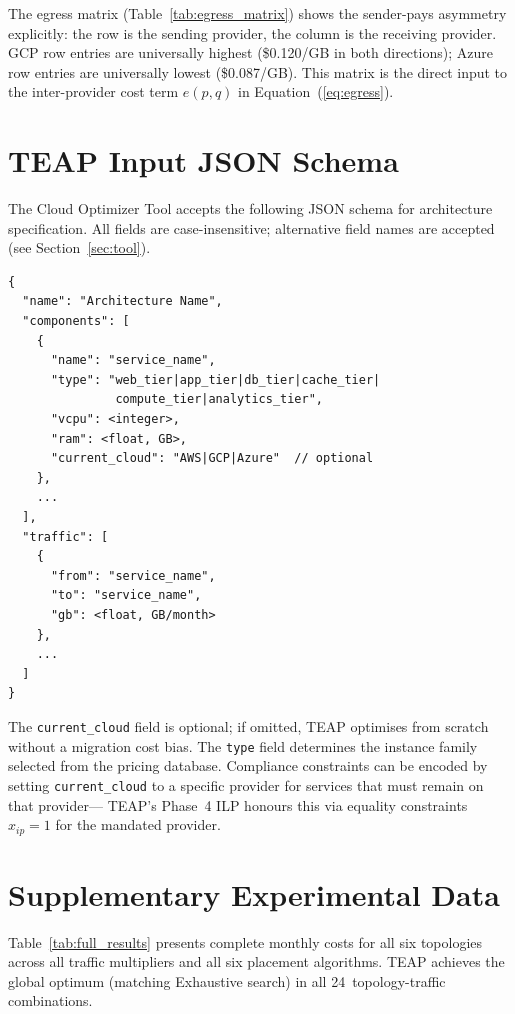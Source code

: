 \documentclass[10pt,journal]{IEEEtran}
\begin{document}
The egress matrix (Table~\ref{tab:egress_matrix}) shows the sender-pays asymmetry
explicitly: the row is the sending provider, the column is the receiving provider.
GCP row entries are universally highest (\$0.120/GB in both directions);
Azure row entries are universally lowest (\$0.087/GB).
This matrix is the direct input to the inter-provider cost term
$e(p,q)$ in Equation~(\ref{eq:egress}).

\section{TEAP Input JSON Schema}\label{app:schema}

The Cloud Optimizer Tool accepts the following JSON schema for architecture
specification.
All fields are case-insensitive; alternative field names are accepted
(see Section~\ref{sec:tool}).

{\small\begin{verbatim}
{
  "name": "Architecture Name",
  "components": [
    {
      "name": "service_name",
      "type": "web_tier|app_tier|db_tier|cache_tier|
               compute_tier|analytics_tier",
      "vcpu": <integer>,
      "ram": <float, GB>,
      "current_cloud": "AWS|GCP|Azure"  // optional
    },
    ...
  ],
  "traffic": [
    {
      "from": "service_name",
      "to": "service_name",
      "gb": <float, GB/month>
    },
    ...
  ]
}
\end{verbatim}}

The \texttt{current\_cloud} field is optional; if omitted, TEAP optimises
from scratch without a migration cost bias.
The \texttt{type} field determines the instance family selected from the
pricing database.
Compliance constraints can be encoded by setting \texttt{current\_cloud}
to a specific provider for services that must remain on that provider---
TEAP's Phase~4 ILP honours this via equality constraints
$x_{ip} = 1$ for the mandated provider.

\section{Supplementary Experimental Data}\label{app:supp}

Table~\ref{tab:full_results} presents complete monthly costs for all six topologies
across all traffic multipliers and all six placement algorithms. TEAP achieves the
global optimum (matching Exhaustive search) in all 24~topology-traffic combinations.
\end{document}
